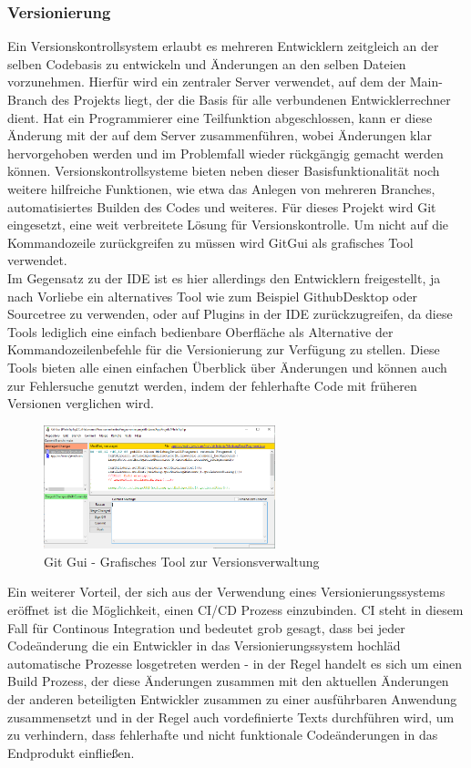 \subsubsection{Versionierung}

Ein Versionskontrollsystem erlaubt es mehreren Entwicklern zeitgleich an der selben Codebasis zu entwickeln und Änderungen an den selben Dateien vorzunehmen. Hierfür wird ein zentraler Server verwendet, auf dem der Main-Branch des Projekts liegt, der die Basis für alle verbundenen Entwicklerrechner dient. Hat ein Programmierer eine Teilfunktion abgeschlossen, kann er diese Änderung mit der auf dem Server zusammenführen, wobei Änderungen klar hervorgehoben werden und im Problemfall wieder rückgängig gemacht werden können. Versionskontrollsysteme bieten neben dieser Basisfunktionalität noch weitere hilfreiche Funktionen, wie etwa das Anlegen von mehreren Branches, automatisiertes Builden des Codes und weiteres. Für dieses Projekt wird Git \cite{git}  eingesetzt, eine weit verbreitete Lösung für Versionskontrolle. Um nicht auf die Kommandozeile zurückgreifen zu müssen wird GitGui als grafisches Tool verwendet.\\

Im Gegensatz zu der IDE ist es hier allerdings den Entwicklern freigestellt, ja nach Vorliebe ein alternatives Tool wie zum Beispiel GithubDesktop oder Sourcetree zu verwenden, oder auf Plugins in der IDE zurückzugreifen, da diese Tools lediglich eine einfach bedienbare Oberfläche als Alternative der Kommandozeilenbefehle für die Versionierung zur Verfügung zu stellen. Diese Tools bieten alle einen einfachen Überblick über Änderungen und können auch zur Fehlersuche genutzt werden, indem der fehlerhafte Code mit früheren Versionen verglichen wird.\\

\begin{figure}[!h]
\centering
\includegraphics[width=0.6\textwidth]{gitgui}
\caption{Git Gui - Grafisches Tool zur Versionsverwaltung}
\end{figure}

Ein weiterer Vorteil, der sich aus der Verwendung eines Versionierungssystems eröffnet ist die Möglichkeit, einen CI/CD Prozess einzubinden. CI steht in diesem Fall für Continous Integration und bedeutet grob gesagt, dass bei jeder Codeänderung die ein Entwickler in das Versionierungssystem hochläd automatische Prozesse losgetreten werden - in der Regel handelt es sich um einen Build Prozess, der diese Änderungen zusammen mit den aktuellen Änderungen der anderen beteiligten Entwickler zusammen zu einer ausführbaren Anwendung zusammensetzt und in der Regel auch vordefinierte Texts durchführen wird, um zu verhindern, dass fehlerhafte und nicht funktionale Codeänderungen in das Endprodukt einfließen.\\

